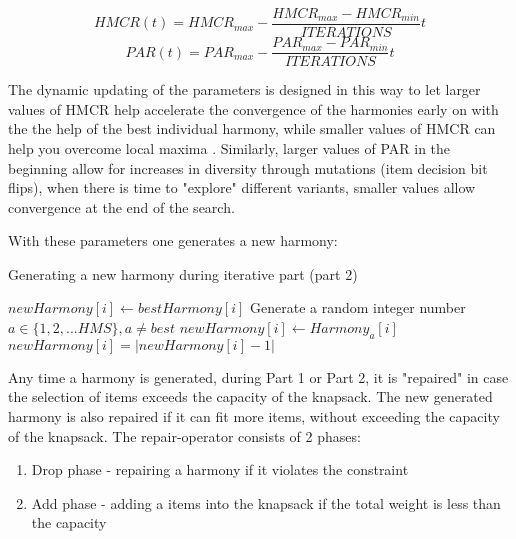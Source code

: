 \documentclass[titlepage]{article}
\begin{document}
\begin{equation}
    HMCR(t) = HMCR_{max} - \frac{HMCR_{max}-HMCR_{min}}{ITERATIONS} t
\end{equation}
\begin{equation}
    PAR(t) = PAR_{max} - \frac{PAR_{max}-PAR_{min}}{ITERATIONS} t
\end{equation}

The dynamic updating of the parameters is designed in this way to let larger values of HMCR help accelerate the convergence of the harmonies early on with the the help of the best individual harmony, while smaller values of HMCR can help you overcome local maxima \cite{DGHS-article}. Similarly, larger values of PAR in the beginning allow for increases in diversity through mutations (item decision bit flips), when there is time to "explore" different variants, smaller values allow convergence at the end of the search. 

With these parameters one generates a new harmony:

\begin{breakablealgorithm}
\caption{Generating a new harmony during iterative part (part 2)}\label{harmonyGen}
    \begin{algorithmic}[1]
                \State $newHarmony[i] \gets bestHarmony[i]$ 
            \Else
                \State Generate a random integer number $a \in \{1, 2, ... HMS\}, a \neq best$
                \State $newHarmony[i] \gets Harmony_{a}[i]$ 
                    \State $newHarmony[i] = |newHarmony[i]-1|$ \Comment{\textcolor{blue}{Flipping i'th item - mutation}}
                \EndIf
            \EndIf
        \EndFor
    \end{algorithmic}
\end{breakablealgorithm}
\vskip 0.5cm


Any time a harmony is generated, during Part 1 or Part 2, it is "repaired" in case the selection of items exceeds the capacity of the knapsack. The new generated harmony is also repaired if it can fit more items, without exceeding the capacity of the knapsack. The repair-operator consists of 2 phases:
\begin{enumerate}
    \item Drop phase - repairing a harmony if it violates the constraint
    \item Add phase - adding a items into the knapsack if the total weight is less than the capacity
\end{enumerate}
\end{document}
